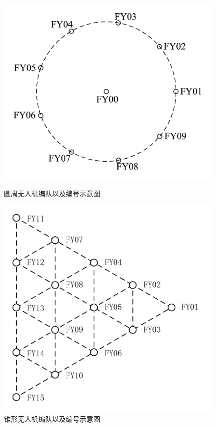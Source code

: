 \documentclass[12pt,AutoFakeSlant,AutoFakeBold]{article}
\begin{document}
\begin{figure}[!ht]
    \centering
    \begin{minipage}[t]{0.48\textwidth}
        \centering
        \includegraphics[width=\textwidth]{图片/无人机以及编号示意图.pdf}
        \caption{圆周无人机编队以及编号示意图}
        \label{fig:编号示意图}
    \end{minipage}
    \begin{minipage}[t]{0.48\textwidth}
        \centering
        \includegraphics[width=\textwidth]{图片/锥形队列.pdf}
        \caption{锥形无人机编队以及编号示意图}
        \label{fig:锥形编队}
    \end{minipage}
\end{figure}
\end{document}
